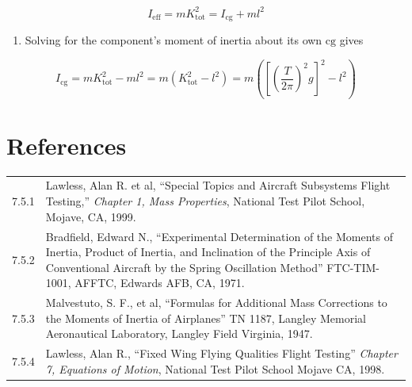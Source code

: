 \documentclass[
]{book}
\providecommand{\tightlist}{%
  \setlength{\itemsep}{0pt}\setlength{\parskip}{0pt}}
\begin{document}
\[ I_{\mathrm{eff}} = m K_{\mathrm{tot}}^2 = I_{\mathrm{cg}} + ml^2 \]

\begin{enumerate}
\def\labelenumi{\arabic{enumi}.}
\setcounter{enumi}{2}
\tightlist
\item
  Solving for the component's moment of inertia about its own \(\mathrm{cg}\) gives
\end{enumerate}

\[ I_{\mathrm{cg}} = m K_{\mathrm{tot}}^2 - ml^2 = m \left( K_{\mathrm{tot}}^2 - l^2 \right) = m \left( \left[ \left( \frac{T}{2 \pi} \right)^2 g \right]^2 - l^2 \right) \]

\hypertarget{references}{%
\section{References}\label{references}}

\begin{longtable}[]{@{}ll@{}}
\toprule
\endhead
\begin{minipage}[t]{0.05\columnwidth}\raggedright
7.5.1\strut
\end{minipage} & \begin{minipage}[t]{0.89\columnwidth}\raggedright
Lawless, Alan R. et al, ``Special Topics and Aircraft Subsystems Flight Testing,'' \emph{Chapter 1, Mass Properties}, National Test Pilot School, Mojave, CA, 1999.\strut
\end{minipage}\tabularnewline
\begin{minipage}[t]{0.05\columnwidth}\raggedright
7.5.2\strut
\end{minipage} & \begin{minipage}[t]{0.89\columnwidth}\raggedright
Bradfield, Edward N., ``Experimental Determination of the Moments of Inertia, Product of Inertia, and Inclination of the Principle Axis of Conventional Aircraft by the Spring Oscillation Method'' FTC-TIM-1001, AFFTC, Edwards AFB, CA, 1971.\strut
\end{minipage}\tabularnewline
\begin{minipage}[t]{0.05\columnwidth}\raggedright
7.5.3\strut
\end{minipage} & \begin{minipage}[t]{0.89\columnwidth}\raggedright
Malvestuto, S. F., et al, ``Formulas for Additional Mass Corrections to the Moments of Inertia of Airplanes'' TN 1187, Langley Memorial Aeronautical Laboratory, Langley Field Virginia, 1947.\strut
\end{minipage}\tabularnewline
\begin{minipage}[t]{0.05\columnwidth}\raggedright
7.5.4\strut
\end{minipage} & \begin{minipage}[t]{0.89\columnwidth}\raggedright
Lawless, Alan R., ``Fixed Wing Flying Qualities Flight Testing'' \emph{Chapter 7, Equations of Motion}, National Test Pilot School Mojave CA, 1998.\strut
\end{minipage}\tabularnewline
\bottomrule
\end{longtable}
\end{document}
